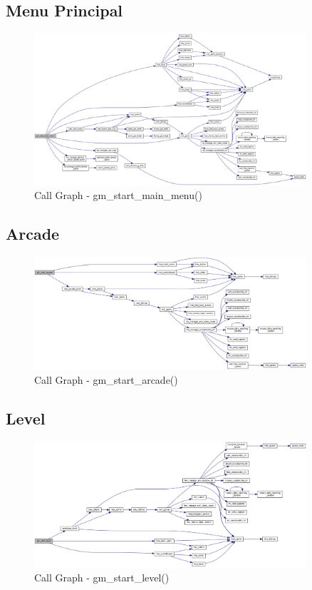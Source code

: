 \documentclass{report}
\begin{document}
\subsection{Menu Principal}

\begin{figure}[H]
	\centering
	\includegraphics[width=0.9\textwidth]{gm_start_main_menu}
	\caption{Call Graph - gm\_start\_main\_menu()}
\end{figure}

\subsection{Arcade}

\begin{figure}[H]
	\centering
	\includegraphics[width=0.9\textwidth]{gm_start_arcade}
	\caption{Call Graph - gm\_start\_arcade()}
\end{figure}

\subsection{Level}

\begin{figure}[H]
	\centering
	\includegraphics[width=0.9\textwidth]{gm_start_level}
	\caption{Call Graph - gm\_start\_level()}
\end{figure}
\end{document}
